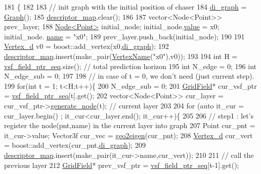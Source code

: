\begin{DoxyCode}
181                                                               \{
182     
183     \textcolor{comment}{// init graph with the initial position of chaser }
184     \hyperlink{class_preplanner_af588e8495d5e78dd5a746f7c640daa4d}{di\_graph} = \hyperlink{_common_8h_a45f376d452c699e18013842e64602733}{Graph}();
185     \hyperlink{class_preplanner_a45603cfb24429584c4fc8bc42474e1ff}{descriptor\_map}.clear();
186     
187     vector<Node<Point>> prev\_layer;
188     \hyperlink{struct_node}{Node<Point>} initial\_node; initial\_node.\hyperlink{struct_node_a01b9071c0de774c720b64583262d1559}{value} = x0; initial\_node.
      \hyperlink{struct_node_a795bdc93cbf63ccddcdf2168d858492c}{name} = \textcolor{stringliteral}{"x0"};
189     prev\_layer.push\_back(initial\_node);
190     
191     \hyperlink{_common_8h_a1f671d518f573b692b5efa57ed576f36}{Vertex\_d} v0 = boost::add\_vertex(x0,\hyperlink{class_preplanner_af588e8495d5e78dd5a746f7c640daa4d}{di\_graph});
192     \hyperlink{class_preplanner_a45603cfb24429584c4fc8bc42474e1ff}{descriptor\_map}.insert(make\_pair(\hyperlink{_common_8h_a817e52d0171d1503034d4cbe7fd89a1b}{VertexName}(\textcolor{stringliteral}{"x0"}),v0));
193  
194     \textcolor{keywordtype}{int} H = \hyperlink{class_preplanner_aab0f91e34b86eaa581c7642ba5059308}{vsf\_field\_ptr\_seq}.size(); \textcolor{comment}{// total prediction horizon }
195     \textcolor{keywordtype}{int} N\_edge = 0; 
196     \textcolor{keywordtype}{int} N\_edge\_sub = 0;
197 
198     \textcolor{comment}{// in case of t = 0, we don't need (just current step). }
199     \textcolor{keywordflow}{for}(\textcolor{keywordtype}{int} t = 1; t<H;t++)\{
200         N\_edge\_sub = 0;
201         \hyperlink{struct_grid_field}{GridField}* cur\_vsf\_ptr = \hyperlink{class_preplanner_aab0f91e34b86eaa581c7642ba5059308}{vsf\_field\_ptr\_seq}[t].get();        
202         vector<Node<Point>> cur\_layer = cur\_vsf\_ptr->\hyperlink{struct_grid_field_acd8fd9f0893ad94aa4f20b4b4d81802a}{generate\_node}(t); \textcolor{comment}{// current layer   }
203 
204         \textcolor{keywordflow}{for} (\textcolor{keyword}{auto} it\_cur = cur\_layer.begin() ; it\_cur<cur\_layer.end(); it\_cur++)\{
205             
206             \textcolor{comment}{// step1 :  let's register the node(pnt,name) in the current layer into graph }
207             Point cur\_pnt = it\_cur->value; Vector3f cur\_vec = \hyperlink{_common_8h_a3e35de4eb7396984c2c5018768885d91}{geo2eigen}(cur\_pnt); 
208             \hyperlink{_common_8h_a1f671d518f573b692b5efa57ed576f36}{Vertex\_d} cur\_vert = boost::add\_vertex(cur\_pnt,\hyperlink{class_preplanner_af588e8495d5e78dd5a746f7c640daa4d}{di\_graph});
209             \hyperlink{class_preplanner_a45603cfb24429584c4fc8bc42474e1ff}{descriptor\_map}.insert(make\_pair(it\_cur->name,cur\_vert));
210             
211             \textcolor{comment}{// call the previous layer  }
212             \hyperlink{struct_grid_field}{GridField}* prev\_vsf\_ptr = \hyperlink{class_preplanner_aab0f91e34b86eaa581c7642ba5059308}{vsf\_field\_ptr\_seq}[t-1].get();              
                

\end{DoxyCode}
